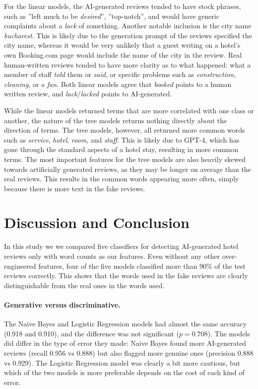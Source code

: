 \documentclass{article}
\begin{document}
For the linear models, the AI-generated reviews tended to have stock phrases, such as ''left much to be \emph{desired}'', ''top-notch'', and would have generic complaints about a \emph{lack} of something. Another notable inclusion is the city name \emph{bucharest}. This is likely due to the generation prompt of the reviews specified the city name, whereas it would be very unlikely that a guest writing on a hotel's own Booking.com page would include the name of the city in the review. Real human-written reviews tended to have more clarity as to what happened: what a member of staff \emph{told} them or \emph{said}, or specific problems such as \emph{construction}, \emph{cleaning}, or a \emph{fan}. Both linear models agree that \emph{booked} points to a human written review, and \emph{lack}/\emph{lacked} points to AI-generated. 

While the linear models returned terms that are more correlated with one class or another, the nature of the tree models returns nothing directly about the direction of terms. The tree models, however, all returned more common words  such as \emph{service}, \emph{hotel}, \emph{room}, and \emph{staff}. This is likely due to GPT-4, which has gone through the standard aspects of a hotel stay, resulting in more common terms. The most important features for the tree models are also heavily skewed towards artificially generated reviews, as they may be longer on average than the real reviews. This results in the common words appearing more often, simply because there is more text in the fake reviews. 


\section{Discussion and Conclusion}

In this study we we compared five classifiers for detecting AI-generated hotel reviews only with word counts as our features. Even without any other over-engineered features, four of the five models classified more than 90\% of the test reviews correctly. This shows that the words used in the fake reviews are clearly distinguishable from the real ones in the words used. 

\paragraph{Generative versus discriminative.} The Naive Bayes and Logistic Regression models had almost the same accuracy (0.918 and 0.910), and the difference was not significant ($p = 0.708$). The models did differ in the type of error they made: Naive Bayes found more AI-generated reviews (recall 0.956 vs 0.888) but also flagged more genuine ones (precision 0.888 vs 0.929). The Logistic Regression model was clearly a bit more cautious, but which of the two models is more preferable depends on the cost of each kind of error.
 
\end{document}
